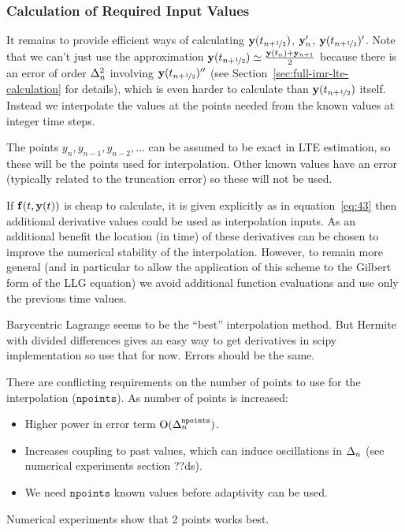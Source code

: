 \subsubsection{Calculation of Required Input Values}
\label{sec:calc-requ-input}

It remains to provide efficient ways of calculating $\mathbf{y}(t_{n+\nicefrac{1}{2}})$, $\mathbf{y}_n'$, $\mathbf{y}(t_{n+\nicefrac{1}{2}})'$.
Note that we can't just use the approximation $\mathbf{y}(t_{n+\nicefrac{1}{2}}) \simeq \frac{\mathbf{y}(t_n) + \mathbf{y}_{n+1}}{2}$ because there is an error of order $\Delta_{n}^2$ involving $\mathbf{y}(t_{n+\nicefrac{1}{2}})''$ (see Section~\ref{sec:full-imr-lte-calculation} for details), which is even harder to calculate than $\mathbf{y}(t_{n+\nicefrac{1}{2}})$ itself.
Instead we interpolate the values at the points needed from the known values at integer time steps.

The points $y_n, y_{n-1}, y_{n-2}, \ldots$ can be assumed to be exact in LTE estimation, so these will be the points used for interpolation.
Other known values have an error (typically related to the truncation error) so these will not be used.

If ${\mathbf{f}}(t, \mathbf{y}(t))$ is cheap to calculate, \ie it is given explicitly as in equation~\eqref{eq:43} then additional derivative values could be used as interpolation inputs.
As an additional benefit the location (in time) of these derivatives can be chosen to improve the numerical stability of the interpolation.
However, to remain more general (and in particular to allow the application of this scheme to the Gilbert form of the LLG equation) we avoid additional function evaluations and use only the previous time values.

Barycentric Lagrange seems to be the ``best'' interpolation method.\cite{Berrut2004}
But Hermite with divided differences gives an easy way to get derivatives in scipy implementation so use that for now.
Errors should be the same.


There are conflicting requirements on the number of points to use for the interpolation ($\texttt{npoints}$). As number of points is increased:
\begin{itemize}
\item Higher power in error term $\text{O}(\Delta_{n}^\texttt{npoints})$.
\item Increases coupling to past values, which can induce oscillations in $\Delta_{n}$ (see numerical experiments section ??ds).
\item We need $\texttt{npoints}$ known values before adaptivity can be used.
\end{itemize}
Numerical experiments show that 2 points works best.


